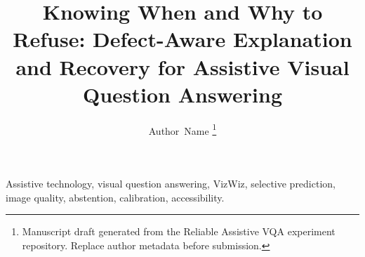 \documentclass[10pt,journal]{IEEEtran}
\title{Knowing When and Why to Refuse: Defect-Aware Explanation and Recovery for Assistive Visual Question Answering}
\author{Author~Name%
\thanks{Manuscript draft generated from the Reliable Assistive VQA experiment repository. Replace author metadata before submission.}}
\begin{document}
\maketitle



\begin{IEEEkeywords}
Assistive technology, visual question answering, VizWiz, selective prediction, image quality, abstention, calibration, accessibility.
\end{IEEEkeywords}













\end{document}

